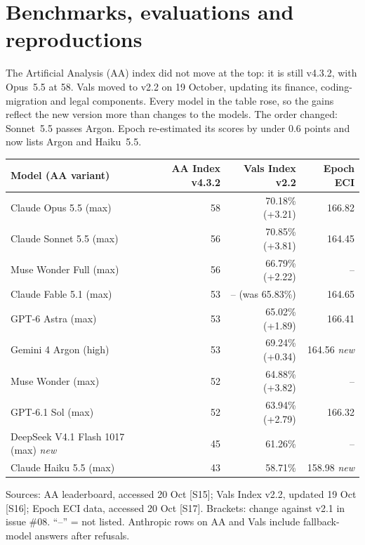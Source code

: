 \documentclass[11pt,a4paper]{article}
\newcommand{\srcref}[1]{\textcolor{brandaccent}{[S#1]}}
\begin{document}
\section{Benchmarks, evaluations and reproductions}

The Artificial Analysis (AA) index did not move at the top: it is still v4.3.2, with Opus~5.5 at 58. Vals moved to v2.2 on 19 October,
updating its finance, coding-migration and legal components. Every model in the table rose, so the gains reflect
the new version more than changes to the models. The order changed: Sonnet~5.5 passes Argon. Epoch re-estimated its scores by under 0.6 points and now
lists Argon and Haiku~5.5.

{\small
\begin{tabularx}{\textwidth}{@{}X r r r@{}}
\toprule
\textbf{Model (AA variant)} & \textbf{AA Index v4.3.2} & \textbf{Vals Index v2.2} & \textbf{Epoch ECI} \\
\midrule
Claude Opus 5.5 (max)          & 58 & 70.18\% (+3.21) & 166.82 \\
Claude Sonnet 5.5 (max)        & 56 & 70.85\% (+3.81) & 164.45 \\
Muse Wonder Full (max)         & 56 & 66.79\% (+2.22) & -- \\
Claude Fable 5.1 (max)         & 53 & -- (was 65.83\%) & 164.65 \\
GPT-6 Astra (max)              & 53 & 65.02\% (+1.89) & 166.41 \\
Gemini 4 Argon (high)          & 53 & 69.24\% (+0.34) & 164.56 \emph{new} \\
Muse Wonder (max)              & 52 & 64.88\% (+3.82) & -- \\
GPT-6.1 Sol (max)              & 52 & 63.94\% (+2.79) & 166.32 \\
DeepSeek V4.1 Flash 1017 (max) \emph{new} & 45 & 61.26\% & -- \\
Claude Haiku 5.5 (max)         & 43 & 58.71\% & 158.98 \emph{new} \\
\bottomrule
\end{tabularx}}
\par\vspace{0.2em}
{\footnotesize\color{brandgrey}Sources: AA leaderboard, accessed 20 Oct \srcref{15}; Vals Index v2.2, updated 19 Oct \srcref{16};
Epoch ECI data, accessed 20 Oct \srcref{17}. Brackets: change against v2.1 in issue \#08. ``--'' = not listed. Anthropic rows on AA
and Vals include fallback-model answers after refusals.}
\vspace{0.3em}
\end{document}
